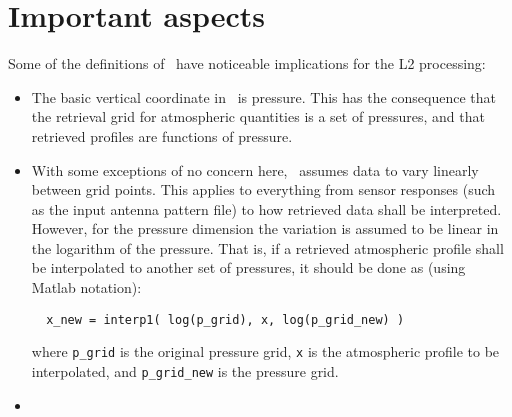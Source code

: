 \section{Important aspects}
\label{sec:arts:aspects}
%
Some of the definitions of \ARTS\ have noticeable implications for the
L2 processing:
\begin{itemize}
\item The basic vertical coordinate in \ARTS\ is pressure. This has the
  consequence that the retrieval grid for atmospheric quantities is a set of
  pressures, and that retrieved profiles are functions of pressure.
\item With some exceptions of no concern here, \ARTS\ assumes data to vary
  linearly between grid points. This applies to everything from sensor responses
  (such as the input antenna pattern file) to how retrieved data shall be
  interpreted. However, for the pressure dimension the variation is assumed to
  be linear in the logarithm of the pressure. That is, if a retrieved
  atmospheric profile shall be interpolated to another set of pressures, it
  should be done as (using Matlab notation):
\begin{verbatim}
  x_new = interp1( log(p_grid), x, log(p_grid_new) )
\end{verbatim}
where \verb|p_grid| is the original pressure grid, \verb|x| is the atmospheric
profile to be interpolated, and \verb|p_grid_new| is the pressure grid.
\item {}
\end{itemize}



